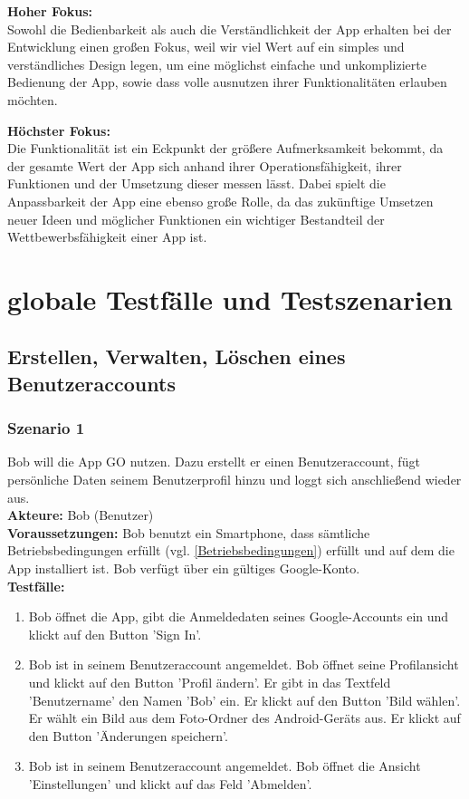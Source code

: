 \documentclass[parskip=full]{scrartcl}
\def\threedigits#1{%
  \ifnum#1<100 0\fi
  \ifnum#1<10 0\fi
  \number#1}
\begin{document}
\textbf{Hoher Fokus:}\\ Sowohl die Bedienbarkeit als auch die Verständlichkeit der App erhalten bei der Entwicklung einen großen Fokus, weil wir viel Wert auf ein simples und verständliches Design legen, um eine möglichst einfache und unkomplizierte Bedienung der App, sowie dass volle ausnutzen ihrer Funktionalitäten erlauben möchten.
	
\textbf{Höchster Fokus:}\\ Die Funktionalität ist ein Eckpunkt der größere Aufmerksamkeit bekommt, da der gesamte Wert der App sich anhand ihrer Operationsfähigkeit, ihrer Funktionen und der Umsetzung dieser messen lässt. Dabei spielt die Anpassbarkeit der App eine ebenso große Rolle, da das zukünftige Umsetzen neuer Ideen und möglicher Funktionen ein wichtiger Bestandteil der Wettbewerbsfähigkeit einer App ist.


\newpage
\section{globale Testfälle und Testszenarien}

\subsection{Erstellen, Verwalten, Löschen eines Benutzeraccounts}

\subsubsection*{Szenario 1}Bob will die App GO nutzen. Dazu erstellt er einen Benutzeraccount, fügt persönliche Daten seinem Benutzerprofil hinzu und loggt sich anschließend wieder aus.\\

\textbf{Akteure:} Bob (Benutzer) \\

\textbf{Voraussetzungen: }Bob benutzt ein Smartphone, dass sämtliche Betriebsbedingungen erfüllt (vgl. \ref{Betriebsbedingungen}) erfüllt und auf dem die App installiert ist. Bob verfügt über ein gültiges Google-Konto.\\

\textbf{Testfälle:}
\begin{enumerate}[label={\textbf{/T\protect\threedigits{\theenumi}0/}}, leftmargin=*]
	\item\label{Registrieren-Test} Bob öffnet die App, gibt die Anmeldedaten seines Google-Accounts ein und klickt auf den Button 'Sign In'.
	\item Bob ist in seinem Benutzeraccount angemeldet. Bob öffnet seine Profilansicht und klickt auf den Button 'Profil ändern'. Er gibt in das Textfeld 'Benutzername' den Namen 'Bob' ein. Er klickt auf den Button 'Bild wählen'. Er wählt ein Bild aus dem Foto-Ordner des Android-Geräts aus. Er klickt auf den Button 'Änderungen speichern'.
	\item Bob ist in seinem Benutzeraccount angemeldet. Bob öffnet die Ansicht 'Einstellungen' und klickt auf das Feld 'Abmelden'.
\end{enumerate}
\end{document}
